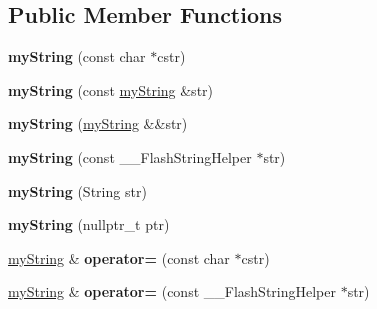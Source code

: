\subsection*{Public Member Functions}
\begin{DoxyCompactItemize}
\item 
\mbox{\label{class_e_s_p_m_a_n_1_1my_string_afc1775fa29859a087342ca597683d147}} 
{\bfseries my\+String} (const char $\ast$cstr)
\item 
\mbox{\label{class_e_s_p_m_a_n_1_1my_string_adcc74eb7f9d25ba712f1e8bd5229d942}} 
{\bfseries my\+String} (const \hyperlink{class_e_s_p_m_a_n_1_1my_string}{my\+String} \&str)
\item 
\mbox{\label{class_e_s_p_m_a_n_1_1my_string_a2819cbc1107839752bcf6c27afa25bb4}} 
{\bfseries my\+String} (\hyperlink{class_e_s_p_m_a_n_1_1my_string}{my\+String} \&\&str)
\item 
\mbox{\label{class_e_s_p_m_a_n_1_1my_string_abd5065ad2d08a4ec16cec6a06fbb4e61}} 
{\bfseries my\+String} (const \+\_\+\+\_\+\+Flash\+String\+Helper $\ast$str)
\item 
\mbox{\label{class_e_s_p_m_a_n_1_1my_string_a36e9284352bf1a9237887aa6d7d28492}} 
{\bfseries my\+String} (String str)
\item 
\mbox{\label{class_e_s_p_m_a_n_1_1my_string_a56252d20748d05a52157b1aa485a144f}} 
{\bfseries my\+String} (nullptr\+\_\+t ptr)
\item 
\mbox{\label{class_e_s_p_m_a_n_1_1my_string_a6f326c837975dac31d99934c21345dab}} 
\hyperlink{class_e_s_p_m_a_n_1_1my_string}{my\+String} \& {\bfseries operator=} (const char $\ast$cstr)
\item 
\mbox{\label{class_e_s_p_m_a_n_1_1my_string_ab763c8547a0476325cb638290073c070}} 
\hyperlink{class_e_s_p_m_a_n_1_1my_string}{my\+String} \& {\bfseries operator=} (const \+\_\+\+\_\+\+Flash\+String\+Helper $\ast$str)
\item 
\mbox{\label{class_e_s_p_m_a_n_1_1my_string_abeb7f40366b22e04ffb133726247989c}} 

\end{DoxyCompactItemize}
